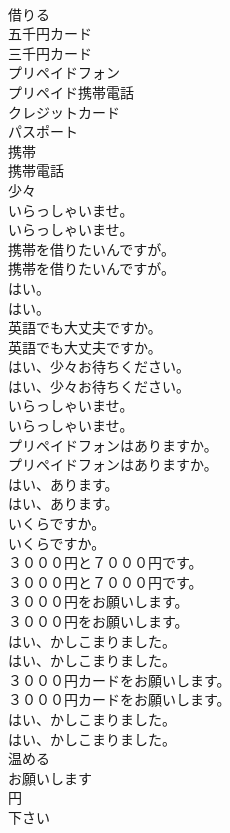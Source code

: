 \documentclass[8pt]{extreport}
\begin{document}
\begin{CJK}{UTF8}{min}
\\	借りる
\\	五千円カード
\\	三千円カード
\\	プリペイドフォン
\\	プリペイド携帯電話
\\	クレジットカード
\\	パスポート
\\	携帯
\\	携帯電話
\\	少々
\\	いらっしゃいませ。	
\\	いらっしゃいませ。 
\\	携帯を借りたいんですが。	
\\	携帯を借りたいんですが。 
\\	はい。	
\\	はい。 
\\	英語でも大丈夫ですか。	
\\	英語でも大丈夫ですか。 
\\	はい、少々お待ちください。	
\\	はい、少々お待ちください。 
\\	いらっしゃいませ。	
\\	いらっしゃいませ。 
\\	プリペイドフォンはありますか。	
\\	プリペイドフォンはありますか。 
\\	はい、あります。	
\\	はい、あります。 
\\	いくらですか。	
\\	いくらですか。 
\\	３０００円と７０００円です。	
\\	３０００円と７０００円です。 
\\	３０００円をお願いします。	
\\	３０００円をお願いします。 
\\	はい、かしこまりました。	
\\	はい、かしこまりました。 
\\	３０００円カードをお願いします。	
\\	３０００円カードをお願いします。 
\\	はい、かしこまりました。	
\\	はい、かしこまりました。 
\\	温める
\\	お願いします
\\	円
\\	下さい

\end{CJK}
\end{document}
